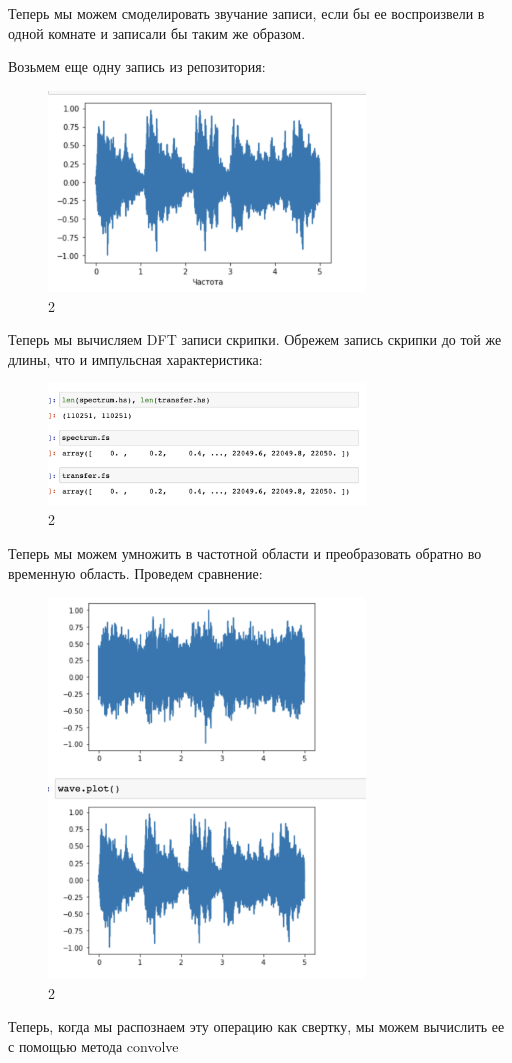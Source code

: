\documentclass[10pt,a4paper,oneside]{article}
\begin{document}
Теперь мы можем смоделировать звучание записи, если бы ее воспроизвели в одной комнате и записали бы таким же образом.

Возьмем еще одну запись из репозитория:

\begin{figure}[H]
        \centering
        \includegraphics[width=0.75\textwidth]{pics/12.png}
        \caption{2}
        \label{fig:first}
\end{figure}

Теперь мы вычисляем DFT записи скрипки. Обрежем запись скрипки до той же длины, что и импульсная характеристика:

\begin{figure}[H]
        \centering
        \includegraphics[width=0.75\textwidth]{pics/13.png}
        \caption{2}
        \label{fig:first}
\end{figure}

Теперь мы можем умножить в частотной области и преобразовать обратно во временную область. Проведем сравнение:

\begin{figure}[H]
        \centering
        \includegraphics[width=0.75\textwidth]{pics/14.png}
        \caption{2}
        \label{fig:first}
\end{figure}

Теперь, когда мы распознаем эту операцию как свертку, мы можем вычислить ее с помощью метода convolve
\end{document}
